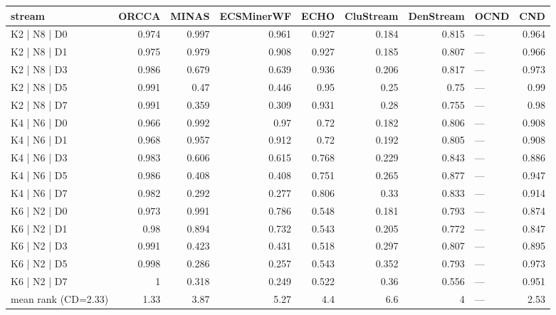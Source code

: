 \begin{tabular}{lrrrrrrlr}
\hline
 stream              &   ORCCA &   MINAS &   ECSMinerWF &   ECHO &   CluStream &   DenStream & OCND   &   CND \\
\hline
 K2 | N8 | D0        &   0.974 &   0.997 &        0.961 &  0.927 &       0.184 &       0.815 & ---    & 0.964 \\
 K2 | N8 | D1        &   0.975 &   0.979 &        0.908 &  0.927 &       0.185 &       0.807 & ---    & 0.966 \\
 K2 | N8 | D3        &   0.986 &   0.679 &        0.639 &  0.936 &       0.206 &       0.817 & ---    & 0.973 \\
 K2 | N8 | D5        &   0.991 &   0.47  &        0.446 &  0.95  &       0.25  &       0.75  & ---    & 0.99  \\
 K2 | N8 | D7        &   0.991 &   0.359 &        0.309 &  0.931 &       0.28  &       0.755 & ---    & 0.98  \\
 K4 | N6 | D0        &   0.966 &   0.992 &        0.97  &  0.72  &       0.182 &       0.806 & ---    & 0.908 \\
 K4 | N6 | D1        &   0.968 &   0.957 &        0.912 &  0.72  &       0.192 &       0.805 & ---    & 0.908 \\
 K4 | N6 | D3        &   0.983 &   0.606 &        0.615 &  0.768 &       0.229 &       0.843 & ---    & 0.886 \\
 K4 | N6 | D5        &   0.986 &   0.408 &        0.408 &  0.751 &       0.265 &       0.877 & ---    & 0.947 \\
 K4 | N6 | D7        &   0.982 &   0.292 &        0.277 &  0.806 &       0.33  &       0.833 & ---    & 0.914 \\
 K6 | N2 | D0        &   0.973 &   0.991 &        0.786 &  0.548 &       0.181 &       0.793 & ---    & 0.874 \\
 K6 | N2 | D1        &   0.98  &   0.894 &        0.732 &  0.543 &       0.205 &       0.772 & ---    & 0.847 \\
 K6 | N2 | D3        &   0.991 &   0.423 &        0.431 &  0.518 &       0.297 &       0.807 & ---    & 0.895 \\
 K6 | N2 | D5        &   0.998 &   0.286 &        0.257 &  0.543 &       0.352 &       0.793 & ---    & 0.973 \\
 K6 | N2 | D7        &   1     &   0.318 &        0.249 &  0.522 &       0.36  &       0.556 & ---    & 0.951 \\
 mean rank (CD=2.33) &   1.33  &   3.87  &        5.27  &  4.4   &       6.6   &       4     & ---    & 2.53  \\
\hline
\end{tabular}